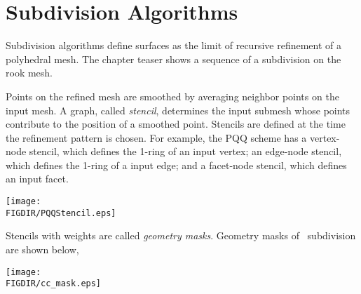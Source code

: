  



\section{Subdivision Algorithms}
Subdivision algorithms define surfaces as the limit
of recursive refinement of a polyhedral mesh. The chapter teaser
shows a sequence of a subdivision on the rook mesh.

Points on the refined mesh are smoothed by averaging
neighbor points on the input mesh. A graph, called \emph{stencil}, 
determines the input submesh whose points contribute to the 
position of a smoothed point. Stencils are defined at the time 
the refinement pattern is chosen. For example, 
the PQQ scheme has a vertex-node stencil, which defines 
the 1-ring of an input vertex; an edge-node stencil, which 
defines the 1-ring of a input edge; and a facet-node stencil,
which defines an input facet.

\begin{ccTexOnly}
  \begin{center}
    \parbox{0.5\textwidth}{%
      \texttt{[image: \\FIGDIR/PQQStencil.eps]}%
    }
  \end{center}
\end{ccTexOnly}

Stencils with weights are called \emph{geometry masks}.
Geometry masks of \CC\ subdivision are shown below,

\begin{ccTexOnly}
  \begin{center}
    \parbox{0.4\textwidth}{%
      \texttt{[image: \\FIGDIR/cc\_mask.eps]}%
    }
  \end{center}
\end{ccTexOnly}

